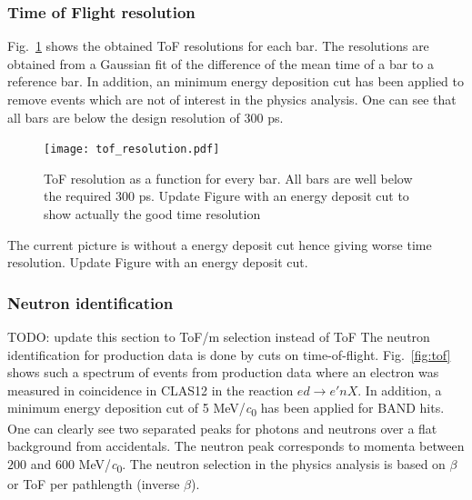 \documentclass[3p,final,twocolumn]{elsarticle}
\begin{document}
{\subsubsection{Time of Flight resolution}
Fig.~\ref{fig:tof_resolution} shows the obtained ToF resolutions for each bar. The resolutions are obtained from a Gaussian fit of the difference of the mean time of a bar to a reference bar.
In addition, an minimum energy deposition cut has been applied to remove events which are not of interest in the physics analysis. One can see that all bars are below the design resolution of
300 \si{\pico\s}. 
\begin{figure}[h!]
	\centering
		\texttt{[image: tof\_resolution.pdf]}
	\caption{ToF resolution as a function for every bar. All bars are well below the required 300 \si{\pico\s}. {\color{red} Update Figure with an energy deposit cut to show actually the good time resolution}}
	\label{fig:tof_resolution}
\end{figure}

{\color{red} The current picture is without a energy deposit cut hence giving worse time resolution. Update Figure with an energy deposit cut.}

\subsubsection{Neutron identification}
{\color{red}  TODO: update this section to ToF/m selection instead of ToF}
The neutron identification for production data is done by cuts on time-of-flight. Fig.~\ref{fig:tof} shows such a spectrum of events from production data where an electron was measured in coincidence in CLAS12 in the reaction $ed \rightarrow e'nX$. In addition, a minimum energy deposition cut of 5 \si{\MeV/\clight} has been applied for BAND hits. One can clearly see two separated peaks for photons and neutrons over a flat background from accidentals. The neutron peak corresponds to momenta between $200$ and $600$ \si{\MeV/\clight}.
The neutron selection in the physics analysis is based on $\beta$ or ToF per pathlength (inverse $\beta$).

}
\end{document}
